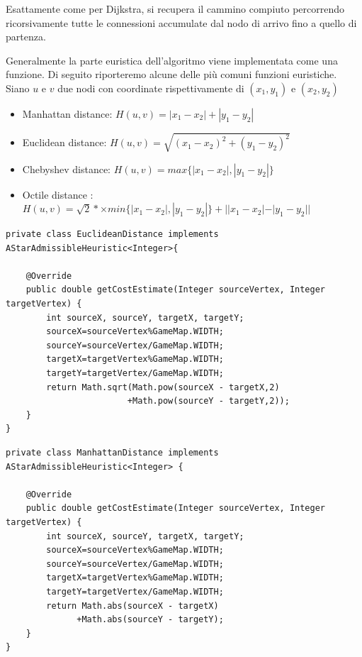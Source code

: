 \documentclass[12pt]{book}
\begin{document}
\par{Esattamente come per Dijkstra, si recupera il cammino compiuto percorrendo ricorsivamente tutte le connessioni accumulate dal nodo di arrivo fino a quello di partenza.}
\par{Generalmente la parte euristica dell'algoritmo viene implementata come una funzione.
Di seguito riporteremo alcune delle pi\`u comuni funzioni euristiche.
 Siano $u$ e $v$ due nodi con coordinate rispettivamente di $(x_1, y_1)$ e $(x_2, y_2)$ }
\begin{itemize}
\item Manhattan distance: $H(u,v) = |x_1 - x_2| + |y_1 - y_2|$
\item Euclidean distance: $H(u,v) = \sqrt{(x_1 - x_2)^2 + (y_1 - y_2)^2}$
\item Chebyshev distance: $H(u,v) = max\{|x_1 - x_2|, |y_1 - y_2|\} $
\item Octile distance : $H(u,v) = \sqrt{2} *× min\{|x_1 - x_2 |, |y_1 - y_2 |\} + ||x_1 - x_2 | - |y_1 - y_2 || $
\end{itemize}
\iffalse
{}
\lstset{style=customjava, label=lstEuclide caption=euclidean distance}
\begin{lstlisting}
private class EuclideanDistance implements AStarAdmissibleHeuristic<Integer>{

    @Override
    public double getCostEstimate(Integer sourceVertex, Integer targetVertex) {
        int sourceX, sourceY, targetX, targetY;
        sourceX=sourceVertex%GameMap.WIDTH;
        sourceY=sourceVertex/GameMap.WIDTH;
        targetX=targetVertex%GameMap.WIDTH;
        targetY=targetVertex/GameMap.WIDTH;
        return Math.sqrt(Math.pow(sourceX - targetX,2)
                        +Math.pow(sourceY - targetY,2));
    }
}
\end{lstlisting}
\lstset{style=customjava,label=lstManhattan, caption=Manhattan distance}
\begin{lstlisting}
private class ManhattanDistance implements AStarAdmissibleHeuristic<Integer> {

    @Override
    public double getCostEstimate(Integer sourceVertex, Integer targetVertex) {
        int sourceX, sourceY, targetX, targetY;
        sourceX=sourceVertex%GameMap.WIDTH;
        sourceY=sourceVertex/GameMap.WIDTH;
        targetX=targetVertex%GameMap.WIDTH;
        targetY=targetVertex/GameMap.WIDTH;
        return Math.abs(sourceX - targetX)
              +Math.abs(sourceY - targetY);
    }
}
\end{lstlisting}
\end{document}
